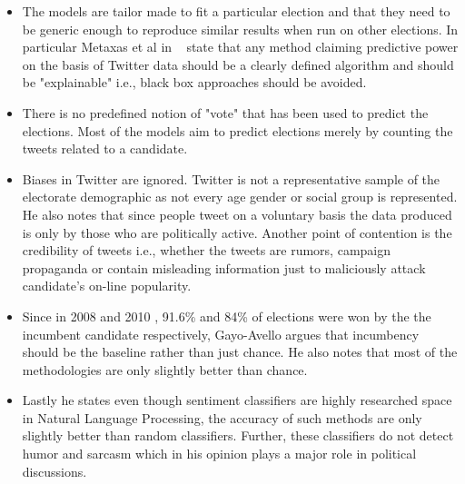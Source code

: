 \begin{itemize}
\item
The models are tailor made to fit a particular election and that they need to be generic enough to reproduce similar results when run on other elections.
In particular Metaxas et al in ~\cite{metaxas2011not} state that any method claiming predictive power on the basis of Twitter data should be a clearly defined algorithm and should be "explainable" i.e., black box approaches should be avoided.
\item
There is no predefined notion of "vote" that has been used to predict the elections.
Most of the models aim to predict elections merely by counting the tweets related to a candidate.
\item
Biases in Twitter are ignored. Twitter is not a representative sample of the electorate demographic as not every age gender or social group is represented.
He also notes that since people tweet on a voluntary basis the data produced is only by those who are politically active. 
Another point of contention is the credibility of tweets i.e., whether the tweets are rumors, campaign propaganda or contain misleading information just to maliciously attack candidate's on-line popularity.
\item
Since in 2008 and 2010 , 91.6\% and 84\% of elections were won by the the incumbent candidate respectively, Gayo-Avello argues that incumbency should be the baseline rather than just chance.
He also notes that most of the methodologies are only slightly better than chance.
\item
Lastly he states even though sentiment classifiers are highly researched space in Natural Language Processing, the accuracy of such methods are only slightly better than random classifiers. 
Further, these classifiers do not detect humor and sarcasm which in his opinion plays a major role in political discussions.
\end{itemize}
